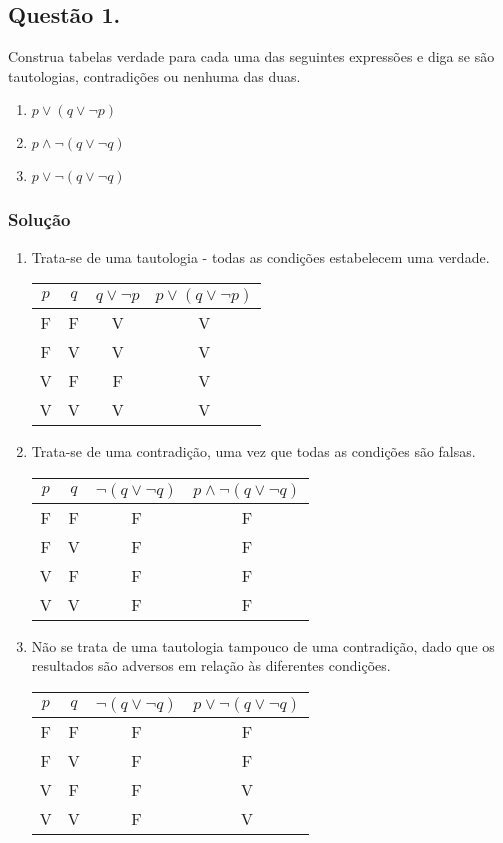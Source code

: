 \documentclass[12pt, letterpaper]{report}
\newcounter{ProblemNum}
\newcommand*{\anyproblem}[1]{\newpage\subsection*{#1}}
\newcommand*{\problem}[1]{\stepcounter{ProblemNum} %
   \anyproblem{Questão #1}}
\newcommand*{\soln}[1]{\subsubsection*{#1}}
\newcommand*{\solution}{\soln{Solução}}
\begin{document}
\problem{1.}
Construa tabelas verdade para cada uma das seguintes expressões e diga se são tautologias, contradições ou nenhuma das duas.
  \begin{enumerate}[label=\arabic*.]
      \item $ p \lor (q \lor \lnot p) $
      \item $ p \land \lnot (q \lor \lnot q) $ 
      \item $ p \lor \lnot (q \lor \lnot q) $
  \end{enumerate}

\solution
  \begin{enumerate}[label=\arabic*.]
    \item Trata-se de uma tautologia - todas as condições estabelecem uma verdade.
    \begin{table}[ht!]
      \centering
      \begin{tabular}{| c | c | c | c |}
        \hline
        $ p $ & $ q $ & $ q \lor \lnot p $ & $ p \lor (q \lor \lnot p) $ \\
        \hline
        F & F & V & V \\ \hline
        F & V & V & V \\ \hline
        V & F & F & V \\ \hline
        V & V & V & V \\ \hline
      \end{tabular}
    \end{table}

    \item Trata-se de uma contradição, uma vez que todas as condições são falsas.
    \begin{table}[ht!]
      \centering
      \begin{tabular}{| c | c | c | c |}
        \hline
        $ p $ & $ q $ & $ \lnot(q \lor \lnot q) $ & $ p \land \lnot(q \lor \lnot q) $ \\
        \hline
        F & F & F & F \\ \hline
        F & V & F & F \\ \hline
        V & F & F & F \\ \hline
        V & V & F & F \\ \hline
      \end{tabular}
    \end{table}

    \item Não se trata de uma tautologia tampouco de uma contradição, dado que os resultados são adversos em relação às diferentes condições.
    \begin{table}[ht!]
      \centering
      \begin{tabular}{| c | c | c | c |}
        \hline
        $ p $ & $ q $ & $ \lnot(q \lor \lnot q) $ & $ p \lor \lnot(q \lor \lnot q) $ \\
        \hline
        F & F & F & F \\ \hline
        F & V & F & F \\ \hline
        V & F & F & V \\ \hline
        V & V & F & V \\ \hline
      \end{tabular}
    \end{table}
  \end{enumerate}
\end{document}
